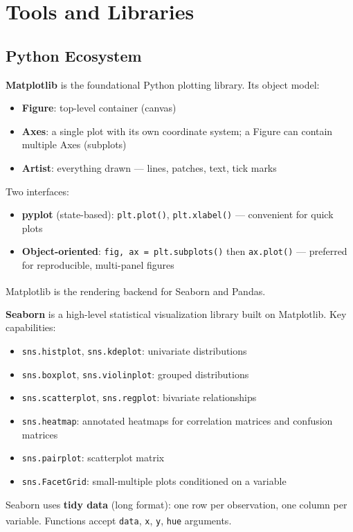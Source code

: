 \section{Tools and Libraries}

\subsection{Python Ecosystem}

\begin{tcbitemize}[ skin=sectionraster ]
    \tcbitem[title={Matplotlib: The Foundation}, raster multicolumn=3]
    \textbf{Matplotlib} is the foundational Python plotting library. Its object model:
    \begin{itemize}
        \item \textbf{Figure}: top-level container (canvas)
        \item \textbf{Axes}: a single plot with its own coordinate system; a Figure
              can contain multiple Axes (subplots)
        \item \textbf{Artist}: everything drawn --- lines, patches, text, tick marks
    \end{itemize}
    Two interfaces:
    \begin{itemize}
        \item \textbf{pyplot} (state-based): \texttt{plt.plot()}, \texttt{plt.xlabel()} ---
              convenient for quick plots
        \item \textbf{Object-oriented}: \texttt{fig, ax = plt.subplots()} then
              \texttt{ax.plot()} --- preferred for reproducible, multi-panel figures
    \end{itemize}
    Matplotlib is the rendering backend for Seaborn and
    Pandas\textsuperscript{\cite[][pp.~55--80]{molinHandsonDataAnalysis2021}}.

    \tcbitem[title={Seaborn: Statistical Plots}, raster multicolumn=3]
    \textbf{Seaborn} is a high-level statistical visualization library built on Matplotlib.
    Key capabilities:
    \begin{itemize}
        \item \texttt{sns.histplot}, \texttt{sns.kdeplot}: univariate distributions
        \item \texttt{sns.boxplot}, \texttt{sns.violinplot}: grouped distributions
        \item \texttt{sns.scatterplot}, \texttt{sns.regplot}: bivariate relationships
        \item \texttt{sns.heatmap}: annotated heatmaps for correlation matrices and
              confusion matrices
        \item \texttt{sns.pairplot}: scatterplot matrix
        \item \texttt{sns.FacetGrid}: small-multiple plots conditioned on a variable
    \end{itemize}
    Seaborn uses \textbf{tidy data} (long format): one row per observation, one column
    per variable. Functions accept \texttt{data}, \texttt{x}, \texttt{y},
    \texttt{hue} arguments\textsuperscript{\cite[][pp.~165--195]{molinHandsonDataAnalysis2021}}.


\end{tcbitemize}
